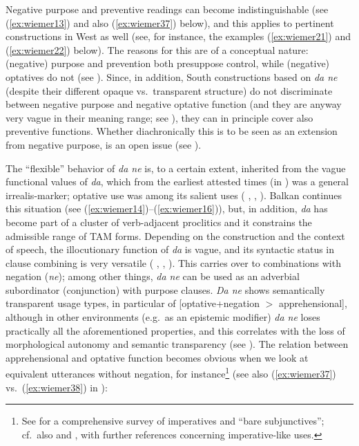 \documentclass[output=paper,colorlinks,citecolor=brown]{langscibook}
\begin{document}
Negative purpose and preventive readings can become indistinguishable (see (\ref{ex:wiemer13}) and also (\ref{ex:wiemer37}) below), and this applies to pertinent constructions in West  as well (see, for instance, the  examples (\ref{ex:wiemer21}) and (\ref{ex:wiemer22}) below). The reasons for this are of a conceptual nature: (negative) purpose and prevention both presuppose control, while (negative) optatives do not (see ). Since, in addition, South  constructions based on \textit{da ne} (despite their different opaque vs.\ transparent structure) do not discriminate between negative purpose and negative optative function (and they are anyway very vague in their meaning range; see ), they can in principle cover also preventive functions. Whether diachronically this is to be seen as an extension from negative purpose, is an open issue (see ).


The ``flexible'' behavior of \textit{da ne} is, to a certain extent, inherited from the vague functional values of \textit{da}, which from the earliest attested times (in ) was a general irrealis-marker; optative use was among its salient uses (\citeauthor{Večerka1993} \citeyear[79]{Večerka1993}, \citeyear[65]{Večerka1996}, \citealt{Grković-Major2020}). Balkan  continues this situation (see (\ref{ex:wiemer14})--(\ref{ex:wiemer16})), but, in addition, \textit{da} has become part of a cluster of verb-adjacent proclitics and it constrains the admissible range of TAM forms. Depending on the construction and the context of speech, the illocutionary function of \textit{da} is vague, and its syntactic status in clause combining is very versatile (\citeauthor{Wiemer2017} \citeyear[300--305, 325--330]{Wiemer2017}, \citeyear[295--306]{Wiemer2018}, \citeyear[58--80]{Wiemer2021}). This carries over to combinations with negation (\textit{ne}); among other things, \textit{da ne} can be used as an adverbial subordinator (conjunction) with purpose clauses. \textit{Da ne} shows semantically transparent usage types, in particular of [optative+negation $>$ apprehensional], although in other environments (e.g.\ as an epistemic modifier) \textit{da ne} loses practically all the aforementioned properties, and this correlates with the loss of morphological autonomy and semantic transparency (see ). The relation between apprehensional and optative function becomes obvious when we look at equivalent utterances without negation, for instance\footnote{See \citet{Tomić2012} for a comprehensive survey of imperatives and ``bare subjunctives''; cf.\ also \citet{Mitkovska2015} and \citet{MitkovskaEtAl2017}, with further references concerning imperative-like uses.} (see also (\ref{ex:wiemer37}) vs.\ (\ref{ex:wiemer38}) in ):
\end{document}
